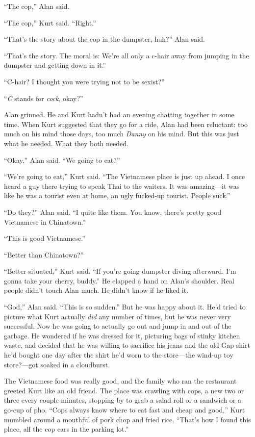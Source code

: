 \documentclass{article}
\begin{document}
``The cop,'' Alan said.

``The cop,'' Kurt said.  ``Right.''

``That's the story about the cop in the dumpster, huh?'' Alan said.

``That's the story.  The moral is:  We're all only a c-hair away from
jumping in the dumpster and getting down in it.''

``C-hair?  I thought you were trying not to be sexist?''

``\textit{C} stands for \textit{cock}, okay?''

Alan grinned.  He and Kurt hadn't had an evening chatting together in
some time.  When Kurt suggested that they go for a ride, Alan had been
reluctant:  too much on his mind those days, too much \textit{Danny}
on his mind.  But this was just what he needed.  What they both
needed.

``Okay,'' Alan said.  ``We going to eat?''

``We're going to eat,'' Kurt said.  ``The Vietnamese place is just up
ahead.  I once heard a guy there trying to speak Thai to the waiters. 
It was amazing---it was like he was a tourist even at home, an ugly
fucked-up tourist.  People suck.''

``Do they?'' Alan said.  ``I quite like them.  You know, there's
pretty good Vietnamese in Chinatown.''

``This is good Vietnamese.''

``Better than Chinatown?''

``Better situated,'' Kurt said.  ``If you're going dumpster diving
afterward.  I'm gonna take your cherry, buddy.'' He clapped a hand on
Alan's shoulder.  Real people didn't touch Alan much.  He didn't know
if he liked it.

``God,'' Alan said.  ``This is so sudden.'' But he was happy about it. 
He'd tried to picture what Kurt actually \textit{did} any number of
times, but he was never very successful.  Now he was going to actually
go out and jump in and out of the garbage.  He wondered if he was
dressed for it, picturing bags of stinky kitchen waste, and decided
that he was willing to sacrifice his jeans and the old Gap shirt he'd
bought one day after the shirt he'd worn to the store---the wind-up
toy store?---got soaked in a cloudburst.

The Vietnamese food was really good, and the family who ran the
restaurant greeted Kurt like an old friend.  The place was crawling
with cops, a new two or three every couple minutes, stopping by to
grab a salad roll or a sandwich or a go-cup of pho.  ``Cops always
know where to eat fast and cheap and good,'' Kurt mumbled around a
mouthful of pork chop and fried rice.  ``That's how I found this
place, all the cop cars in the parking lot.''
\end{document}
